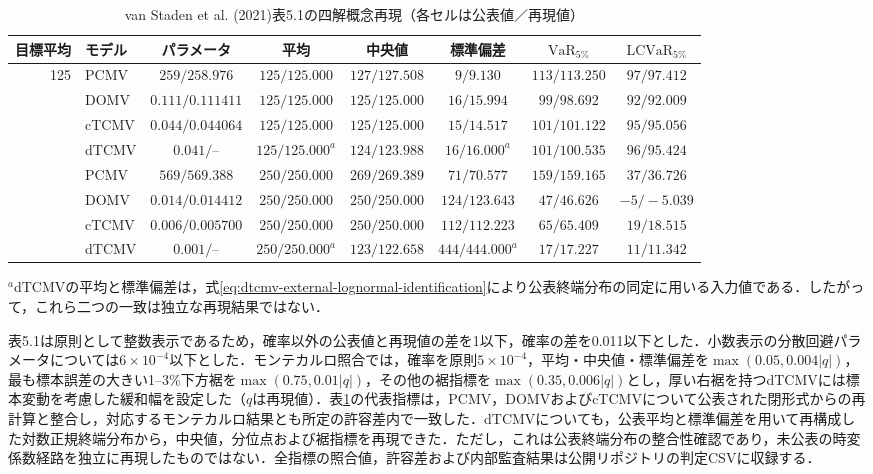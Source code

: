 \documentclass[10pt,a4paper]{article}
\theoremstyle{plain}
\theoremstyle{definition}
\DeclareMathOperator{\VaR}{VaR}
\begin{document}
\begin{table}[htbp]
\centering
\caption{van Staden et al. (2021)表5.1の四解概念再現（各セルは公表値／再現値）}
\label{tab:vanstaden-all-mv-validation}
\scriptsize
\setlength{\tabcolsep}{3.3pt}
\begin{tabular}{@{}rlcccccc@{}}
\toprule
目標平均 & モデル & パラメータ & 平均 & 中央値 & 標準偏差 & $\VaR_{5\%}$ & $\mathrm{LCVaR}_{5\%}$ \\
\midrule
125 & PCMV  & $259/258.976$ & $125/125.000$ & $127/127.508$ & $9/9.130$ & $113/113.250$ & $97/97.412$ \\
    & DOMV  & $0.111/0.111411$ & $125/125.000$ & $125/125.000$ & $16/15.994$ & $99/98.692$ & $92/92.009$ \\
    & cTCMV & $0.044/0.044064$ & $125/125.000$ & $125/125.000$ & $15/14.517$ & $101/101.122$ & $95/95.056$ \\
    & dTCMV & $0.041/\text{--}$ & $125/125.000^{a}$ & $124/123.988$ & $16/16.000^{a}$ & $101/100.535$ & $96/95.424$ \\
\addlinespace
250 & PCMV  & $569/569.388$ & $250/250.000$ & $269/269.389$ & $71/70.577$ & $159/159.165$ & $37/36.726$ \\
    & DOMV  & $0.014/0.014412$ & $250/250.000$ & $250/250.000$ & $124/123.643$ & $47/46.626$ & $-5/-5.039$ \\
    & cTCMV & $0.006/0.005700$ & $250/250.000$ & $250/250.000$ & $112/112.223$ & $65/65.409$ & $19/18.515$ \\
    & dTCMV & $0.001/\text{--}$ & $250/250.000^{a}$ & $123/122.658$ & $444/444.000^{a}$ & $17/17.227$ & $11/11.342$ \\
\bottomrule
\end{tabular}
\begin{minipage}{0.98\textwidth}\vspace{2pt}\scriptsize
$^{a}$dTCMVの平均と標準偏差は，式\eqref{eq:dtcmv-external-lognormal-identification}により公表終端分布の同定に用いる入力値である．したがって，これら二つの一致は独立な再現結果ではない．
\end{minipage}
\end{table}

表5.1は原則として整数表示であるため，確率以外の公表値と再現値の差を1以下，確率の差を0.011以下とした．小数表示の分散回避パラメータについては$6\times10^{-4}$以下とした．モンテカルロ照合では，確率を原則$5\times10^{-4}$，平均・中央値・標準偏差を$\max(0.05,0.004|q|)$，最も標本誤差の大きい1--3\%下方裾を$\max(0.75,0.01|q|)$，その他の裾指標を$\max(0.35,0.006|q|)$とし，厚い右裾を持つdTCMVには標本変動を考慮した緩和幅を設定した（$q$は再現値）．表\ref{tab:vanstaden-all-mv-validation}の代表指標は，PCMV，DOMVおよびcTCMVについて公表された閉形式からの再計算と整合し，対応するモンテカルロ結果とも所定の許容差内で一致した．dTCMVについても，公表平均と標準偏差を用いて再構成した対数正規終端分布から，中央値，分位点および裾指標を再現できた．ただし，これは公表終端分布の整合性確認であり，未公表の時変係数経路を独立に再現したものではない．全指標の照合値，許容差および内部監査結果は公開リポジトリの判定CSVに収録する．
\end{document}
